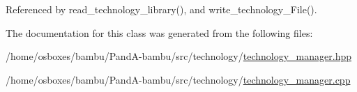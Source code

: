 Referenced by read\+\_\+technology\+\_\+library(), and write\+\_\+technology\+\_\+\+File().



The documentation for this class was generated from the following files\+:\begin{DoxyCompactItemize}
\item 
/home/osboxes/bambu/\+Pand\+A-\/bambu/src/technology/\hyperlink{technology__manager_8hpp}{technology\+\_\+manager.\+hpp}\item 
/home/osboxes/bambu/\+Pand\+A-\/bambu/src/technology/\hyperlink{technology__manager_8cpp}{technology\+\_\+manager.\+cpp}\end{DoxyCompactItemize}
